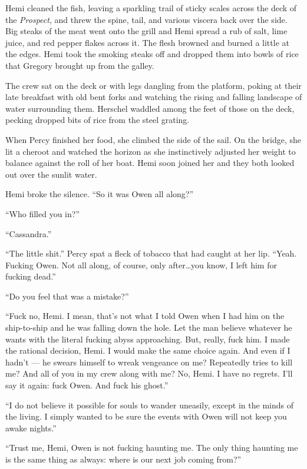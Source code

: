 \documentclass[
]{scrbook}
\begin{document}
Hemi cleaned the fish, leaving a sparkling trail of sticky scales across
the deck of the \emph{Prospect}, and threw the spine, tail, and various
viscera back over the side. Big steaks of the meat went onto the grill
and Hemi spread a rub of salt, lime juice, and red pepper flakes across
it. The flesh browned and burned a little at the edges. Hemi took the
smoking steaks off and dropped them into bowls of rice that Gregory
brought up from the galley.

The crew sat on the deck or with legs dangling from the platform, poking
at their late breakfast with old bent forks and watching the rising and
falling landscape of water surrounding them. Herschel waddled among the
feet of those on the deck, pecking dropped bits of rice from the steel
grating.

When Percy finished her food, she climbed the side of the sail. On the
bridge, she lit a cheroot and watched the horizon as she instinctively
adjusted her weight to balance against the roll of her boat. Hemi soon
joined her and they both looked out over the sunlit water.

Hemi broke the silence. ``So it was Owen all along?''

``Who filled you in?''

``Cassandra.''

``The little shit.'' Percy spat a fleck of tobacco that had caught at
her lip. ``Yeah. Fucking Owen. Not all along, of course, only
after\ldots you know, I left him for fucking dead.''

``Do you feel that was a mistake?''

``Fuck no, Hemi. I mean, that's not what I told Owen when I had him on
the ship-to-ship and he was falling down the hole. Let the man believe
whatever he wants with the literal fucking abyss approaching. But,
really, fuck him. I made the rational decision, Hemi. I would make the
same choice again. And even if I hadn't --- he swears himself to wreak
vengeance on me? Repeatedly tries to kill me? And all of you in my crew
along with me? No, Hemi. I have no regrets. I'll say it again: fuck
Owen. And fuck his ghost.''

``I do not believe it possible for souls to wander uneasily, except in
the minds of the living. I simply wanted to be sure the events with Owen
will not keep you awake nights.''

``Trust me, Hemi, Owen is not fucking haunting me. The only thing
haunting me is the same thing as always: where is our next job coming
from?''
\end{document}
